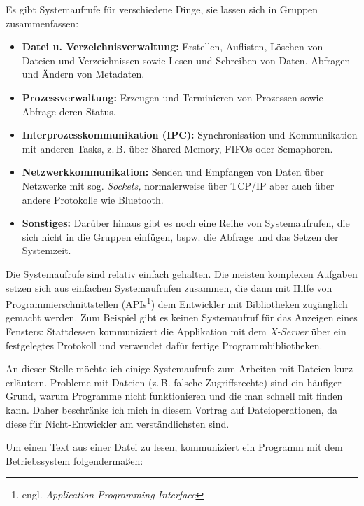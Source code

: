 Es gibt Systemaufrufe für verschiedene Dinge, sie lassen sich in Gruppen
zusammenfassen:

\begin{itemize}
  \item \textbf{Datei u. Verzeichnisverwaltung:} Erstellen, Auflisten, Löschen von Dateien und 
    Verzeichnissen sowie Lesen und Schreiben von Daten. Abfragen und Ändern von Metadaten.
  \item \textbf{Prozessverwaltung:} Erzeugen und Terminieren von Prozessen sowie Abfrage deren 
   Status.
  \item \textbf{Interprozesskommunikation (IPC):} Synchronisation und Kommunikation mit anderen Tasks, z.\,B. über Shared Memory, FIFOs oder Semaphoren.
  \item \textbf{Netzwerkkommunikation:} Senden und Empfangen von Daten über Netzwerke mit sog.
   \emph{Sockets,} normalerweise über TCP/IP aber auch über andere Protokolle wie Bluetooth.
  \item \textbf{Sonstiges:} Darüber hinaus gibt es noch eine Reihe von Systemaufrufen, die sich
    nicht in die Gruppen einfügen, bspw. die Abfrage und das Setzen der Systemzeit.
\end{itemize}

Die Systemaufrufe sind relativ einfach gehalten. Die meisten komplexen Aufgaben setzen sich aus
einfachen Systemaufrufen zusammen, die dann mit Hilfe von Programmierschnittstellen (APIs\footnote{
engl. \emph{Application Programming Interface}}) dem Entwickler mit Bibliotheken zugänglich gemacht
werden. Zum Beispiel gibt es keinen Systemaufruf für das Anzeigen eines Fensters: Stattdessen
kommuniziert die Applikation mit dem \emph{X-Server} über ein festgelegtes Protokoll und verwendet
dafür fertige Programmbibliotheken.


An dieser Stelle möchte ich einige Systemaufrufe zum Arbeiten mit Dateien kurz erläutern. Probleme
mit Dateien (z.\,B. falsche Zugriffsrechte) sind ein häufiger Grund, warum Programme nicht
funktionieren und die man schnell mit \strace{} finden kann. Daher beschränke ich mich in diesem
Vortrag auf Dateioperationen, da diese für Nicht-Entwickler am verständlichsten sind.

Um einen Text aus einer Datei zu lesen, kommuniziert ein Programm mit dem Betriebssystem
folgendermaßen:

